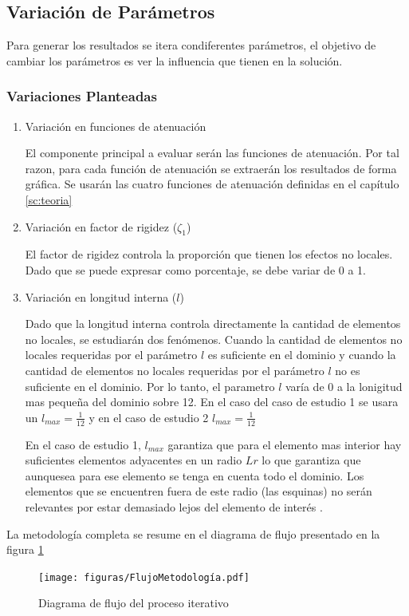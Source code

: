 	\subsection{Variación de Parámetros}
	\label{sub:variacion}
		Para generar los resultados se itera condiferentes parámetros, el objetivo de cambiar los parámetros es ver la influencia que tienen en la solución.
		\subsubsection{Variaciones Planteadas}
			\begin{enumerate}
				\item Variación en funciones de atenuación

				El componente principal a evaluar serán las funciones de atenuación. Por tal razon, para cada función de atenuación se extraerán los resultados de forma gráfica. Se usarán las cuatro funciones de atenuación definidas en el capítulo \ref{sc:teoria}
				\item Variación en factor de rigidez ($\zeta_1$)

				El factor de rigidez controla la proporción que tienen los efectos no locales. Dado que se puede expresar como porcentaje, se debe variar de 0 a 1.
				\item Variación en longitud interna ($l$)

				Dado que la longitud interna controla directamente la cantidad de elementos no locales, se estudiarán dos fenómenos. Cuando la cantidad de elementos no locales requeridas por el parámetro $l$ es suficiente en el dominio y cuando la cantidad de elementos no locales requeridas por el parámetro $l$ no es suficiente en el dominio. Por lo tanto, el parametro $l$ varía de 0 a la lonigitud mas pequeña del dominio sobre 12. En el caso del caso de estudio 1 se usara un $l_{max}=\frac{1}{12}$ y en el caso de estudio 2 $l_{max}=\frac{1}{12}$

				En el caso de estudio 1, $l_{max}$ garantiza que para el elemento mas interior hay suficientes elementos adyacentes en un radio $Lr$ lo que garantiza que aunquesea para ese elemento se tenga en cuenta todo el dominio. Los elementos que se encuentren fuera de este radio (las esquinas) no serán relevantes por estar demasiado lejos del elemento de interés \parencite{Polizzotto2001}. 
			\end{enumerate}
	La metodología completa se resume en el diagrama de flujo presentado en la figura \ref{fig:flowchart}

	\begin{figure}
		\centering
		\sffamily
		\texttt{[image: figuras/FlujoMetodología.pdf]}
		\caption{Diagrama de flujo del proceso iterativo}
		\label{fig:flowchart}
	\end{figure}